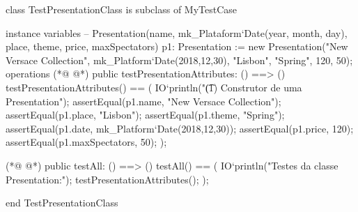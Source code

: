 \begin{vdmpp}[breaklines=true]
class TestPresentationClass is subclass of MyTestCase

instance variables
 -- Presentation(name, mk_Plataform`Date(year, month, day), place, theme, price, maxSpectators)
 p1: Presentation := new Presentation("New Versace Collection", mk_Platform`Date(2018,12,30), "Lisbon", "Spring", 120, 50);
operations
(*@
\label{testPresentationAttributes:7}
@*)
 public testPresentationAttributes: () ==> ()
 testPresentationAttributes() == (
  IO`println("\t (1) Construtor de uma Presentation");
  assertEqual(p1.name, "New Versace Collection");
  assertEqual(p1.place, "Lisbon");
  assertEqual(p1.theme, "Spring");
  assertEqual(p1.date, mk_Platform`Date(2018,12,30));
  assertEqual(p1.price, 120);
  assertEqual(p1.maxSpectators, 50);
 );
  
(*@
\label{testAll:18}
@*)
 public testAll: () ==> ()
 testAll() == (
 IO`println("Testes da classe Presentation:");
  testPresentationAttributes();
 );
 
end TestPresentationClass
\end{vdmpp}
